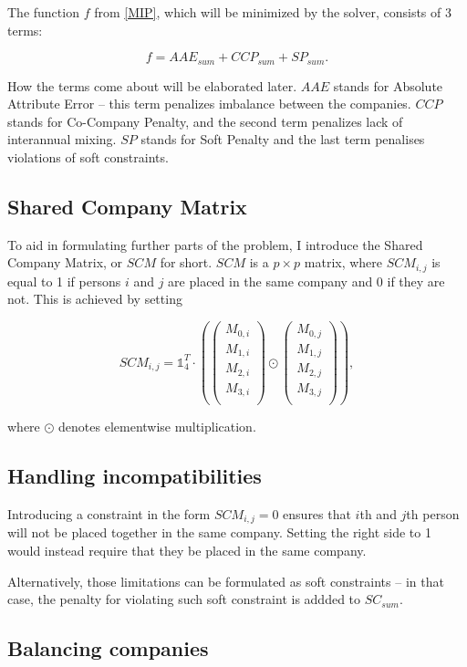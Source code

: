 \documentclass[11pt]{article}
\begin{document}
The function $f$ from \ref{MIP}, which will be minimized by the solver, consists of 3 terms:

\begin{equation}
    f = AAE_{sum} + CCP_{sum} + SP_{sum}.
\end{equation}

How the terms come about will be elaborated later.  $AAE$ stands for Absolute Attribute Error -- this term penalizes imbalance between the companies.  $CCP$
stands for Co-Company Penalty, and the second term penalizes lack of interannual mixing.  $SP$ stands for Soft Penalty and the last term penalises violations
of soft constraints.

\subsection{Shared Company Matrix}
\label{SCM}
To aid in formulating further parts of the problem, I introduce the Shared Company Matrix, or $SCM$ for short.  $SCM$ is a $p\times{}p$ matrix, where 
$SCM_{i,j}$ is equal to 1 if persons $i$ and $j$ are placed in the same company and 0 if they are not.  This is achieved by setting

\begin{equation}
    SCM_{i,j} = \mathbb{1}^{T}_4 \cdot 
    (
        \begin{pmatrix}
        M_{0,i} \\
        M_{1,i} \\
        M_{2,i} \\
        M_{3,i} \\
    \end{pmatrix}
\odot
    \begin{pmatrix}
    M_{0,j} \\
    M_{1,j} \\
    M_{2,j} \\
    M_{3,j} \\
    \end{pmatrix}
    ),
\end{equation}

where $\odot$ denotes elementwise multiplication.

\subsection{Handling incompatibilities}

Introducing a constraint in the form $SCM_{i,j} = 0$ ensures that $i$th and $j$th person will not be placed together in the same company.  Setting the right
side to 1 would instead require that they be placed in the same company.

Alternatively, those limitations can be formulated as soft constraints -- in that case, the penalty for violating such soft constraint is addded to $SC_{sum}$.



\subsection{Balancing companies}
\end{document}
